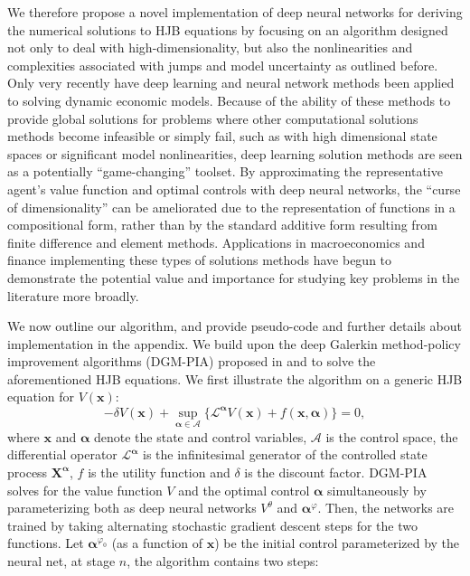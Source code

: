 \documentclass[12pt]{article}
\newcommand{\mc}[1]{\mathcal{#1}}
\begin{document}
We therefore propose a novel implementation of deep neural networks for deriving the numerical solutions to HJB equations by focusing on an algorithm designed not only to deal with high-dimensionality, but also the nonlinearities and complexities associated with jumps and model uncertainty as outlined before. Only very recently have deep learning and neural network methods been applied to solving dynamic economic models. Because of the ability of these methods to provide global solutions for problems where other computational solutions methods become infeasible or simply fail, such as with high dimensional state spaces or significant model nonlinearities, deep learning solution methods are seen as a potentially ``game-changing'' toolset. By approximating the representative agent's value function and optimal controls with deep neural networks, the ``curse of dimensionality'' can be ameliorated due to the representation of functions in a compositional form, rather than by the standard additive form resulting from finite difference and element methods. Applications in macroeconomics \citep{fernandez2020solving, maliar2021deep, azinovic2022deep, payne2024deep} and finance \citep{duarte2018machine, sauzet2021projection} implementing these types of solutions methods have begun to demonstrate the potential value and importance for studying key problems in the literature more broadly. 



We now outline our algorithm, and provide pseudo-code and further details about implementation in the appendix. We build upon the deep Galerkin method-policy improvement algorithms (DGM-PIA) proposed in \cite{al2022extensions} and \cite{duarte2018machine} to solve the aforementioned HJB equations. We first illustrate the algorithm on a generic HJB equation for $V(\bm x)$:
\begin{equation*}\label{eq:HJB_generic}
    - \delta V(\bm x) + \sup_{\bm \alpha \in \mc{A}}\{\mc{L}^{\bm \alpha} V( \bm x) + f(\bm x, \bm \alpha) \} = 0,
\end{equation*}
where $\bm x$ and $\bm \alpha$ denote the state and control variables, $\mc{A}$ is the control space, the differential operator $\mc{L}^{\bm \alpha}$ is the infinitesimal generator of the controlled state process $\bm X^{\bm \alpha}$,   $f$ is the utility function and $\delta$ is the discount factor. DGM-PIA solves for the value function $V$ and the optimal control $\bm \alpha$ simultaneously by parameterizing both as deep neural networks $V^\theta$ and $\bm \alpha^\varphi$. Then, the networks are trained by taking alternating stochastic gradient descent steps for the two functions. Let $\bm \alpha^{\varphi_0}$ (as a function of $\bm x$) be the initial control parameterized by the neural net,  at stage $n$, the algorithm contains two steps:
\end{document}
